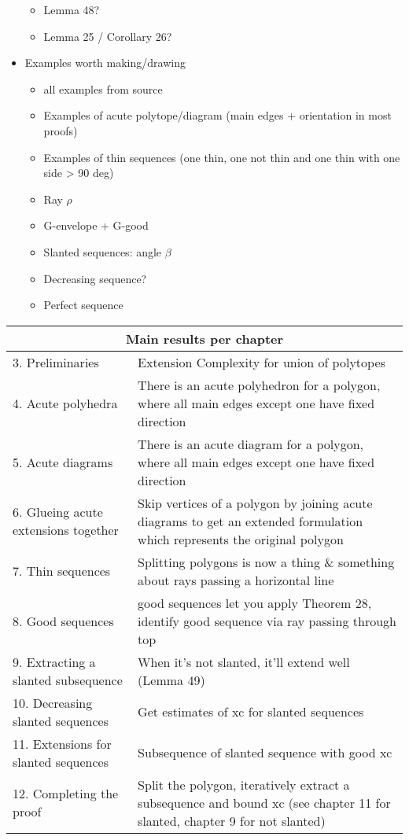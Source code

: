 \begin{itemize}
\begin{itemize}
    \item Lemma 48?
    \item Lemma 25 / Corollary 26?
  \end{itemize}
  \item Examples worth making/drawing
  \begin{itemize}
    \item all examples from source
    \item Examples of acute polytope/diagram (main edges + orientation in most proofs)
    \item Examples of thin sequences (one thin, one not thin and one thin with one side > 90 deg)
    \item Ray $\rho$
    \item G-envelope + G-good
    \item Slanted sequences: angle $\beta$
    \item Decreasing sequence?
    \item Perfect sequence
  \end{itemize}
\end{itemize}

\begin{tabular}{| p{50mm} | p{100mm} |}
  \hline
  \multicolumn{2}{|c|}{\textbf{Main results per chapter}}\\ \hline
  3. Preliminaries & Extension Complexity for union of polytopes \\ \hline
  4. Acute polyhedra & There is an acute polyhedron for a polygon, where all main edges except one have fixed direction \\ \hline
  5. Acute diagrams & There is an acute diagram for a polygon, where all main edges except one have fixed direction \\ \hline
  6. Glueing acute extensions together & Skip vertices of a polygon by joining acute diagrams to get an extended formulation which represents the original polygon \\ \hline
  7. Thin sequences & Splitting polygons is now a thing \& something about rays passing a horizontal line \\ \hline
  8. Good sequences & good sequences let you apply Theorem 28, identify good sequence via ray passing through top \\ \hline
  9. Extracting a slanted subsequence & When it's not slanted, it'll extend well (Lemma 49) \\ \hline
  10. Decreasing slanted sequences & Get estimates of xc for slanted sequences \\ \hline
  11. Extensions for slanted sequences & Subsequence of slanted sequence with good xc \\ \hline
  12. Completing the proof & Split the polygon, iteratively extract a subsequence and bound xc (see chapter 11 for slanted, chapter 9 for not slanted) \\ \hline
\end{tabular}



